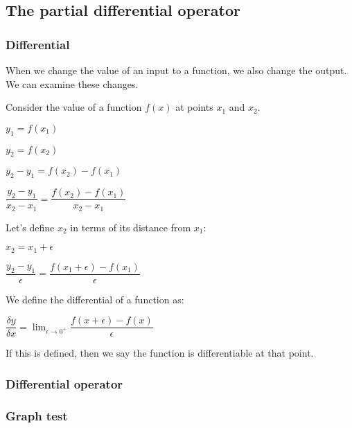 
\subsection{The partial differential operator}

\subsubsection{Differential}

When we change the value of an input to a function, we also change the output. We can examine these changes.

Consider the value of a function \(f(x)\) at points \(x_1\) and \(x_2\).

\(y_1=f(x_1)\)

\(y_2=f(x_2)\)

\(y_2-y_1=f(x_2)-f(x_1)\)

\(\dfrac{y_2-y_1}{x_2-x_1}=\dfrac{f(x_2)-f(x_1)}{x_2-x_1}\)

Let's define \(x_2\) in terms of its distance from \(x_1\):

\(x_2=x_1+\epsilon\)

\(\dfrac{y_2-y_1}{\epsilon }=\dfrac{f(x_1+\epsilon )-f(x_1)}{\epsilon }\)

We define the differential of a function as:

\(\dfrac{\delta y}{\delta x}=\lim_{\epsilon \rightarrow 0^+}\dfrac{f(x+\epsilon )-f(x)}{\epsilon }\)

If this is defined, then we say the function is differentiable at that point.

\subsubsection{Differential operator}

\subsubsection{Graph test}




